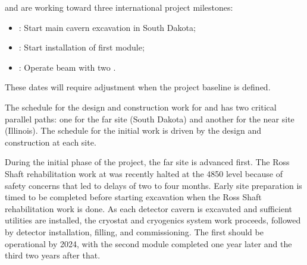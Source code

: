  and  are working toward three international project milestones:
\begin{itemize}
\item \maincavernstartexc{}: Start main cavern excavation in South Dakota; %
\item \startfirsttpcinstall{}: Start installation of first  module; 
\item \beamturnon{}: Operate beam with two .
\end{itemize}
These dates will require adjustment %
when the project baseline is defined. 


The schedule for the design and construction work for  and  has two critical parallel paths: one for the %
far site (South Dakota) %
and another for the %
near site (Illinois). %
The schedule for the initial work is driven by the  design and construction at each site.

During the initial phase of the project, the far site  is advanced first. The Ross Shaft rehabilitation
work at  was recently halted at the 4850 level because of safety concerns that led to delays of two to four months. Early site preparation is timed to be completed 
before starting excavation when the Ross Shaft rehabilitation work is done. As each detector 
 cavern is excavated and sufficient utilities are installed, the cryostat and cryogenics system work proceeds, followed by detector installation, filling, and commissioning. 
The first  should be operational by 2024, with the second module completed one year later and the third two years after that.


